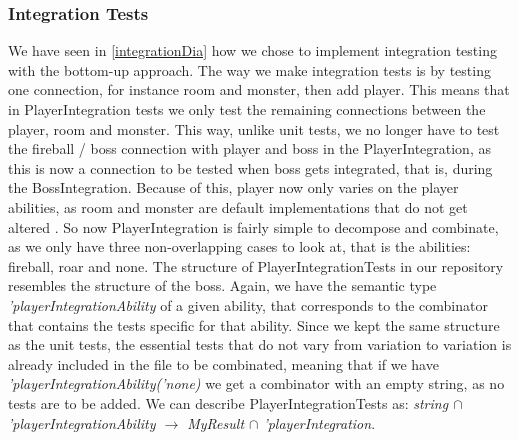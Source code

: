 \subsubsection{Integration Tests} \label{integrationTests}
We have seen in \autoref{integrationDia} how we chose to implement integration testing with the bottom-up approach. The way we make integration tests is by testing one connection, for instance room and monster, then add player. This means that in PlayerIntegration tests we only test the remaining connections between the player, room and monster. This way, unlike unit tests, we no longer have to test the fireball / boss connection with player and boss in the PlayerIntegration, as this is now a connection to be tested when boss gets integrated, that is, during the BossIntegration. Because of this, player now only varies on the player abilities, as room and monster are default implementations that do not get altered . So now PlayerIntegration is fairly simple to decompose and combinate, as we only have three non-overlapping cases to look at, that is the abilities: fireball, roar and none. The structure of PlayerIntegrationTests in our repository resembles the structure of the boss. Again, we have the semantic type \textit{'playerIntegrationAbility} of a given ability, that corresponds to the combinator that contains the tests specific for that ability. Since we kept the same structure as the unit tests, the essential tests that do not vary from variation to variation is already included in the file to be combinated, meaning that if we have \textit{'playerIntegrationAbility('none)} we get a combinator with an empty string, as no tests are to be added. We can describe PlayerIntegrationTests as: \textit{string $\cap$ 'playerIntegrationAbility $\to$ MyResult $\cap$ 'playerIntegration}. \\
